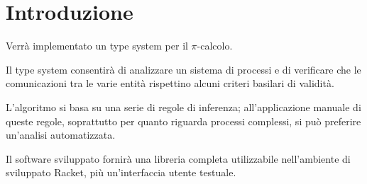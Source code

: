 \chapter{Introduzione}

Verr\`a implementato un type system per il $\pi$-calcolo.

Il type system consentir\`a di analizzare un sistema di processi e di
verificare che le comunicazioni tra le varie entit\`a rispettino alcuni
criteri basilari di validit\`a.

L'algoritmo si basa su una serie di regole di inferenza; all'applicazione
manuale di queste regole, soprattutto per quanto riguarda processi
complessi, si pu\`o preferire un'analisi automatizzata.

Il software sviluppato fornir\`a una libreria completa utilizzabile
nell'ambiente di sviluppato Racket, pi\`u un'interfaccia utente testuale.






